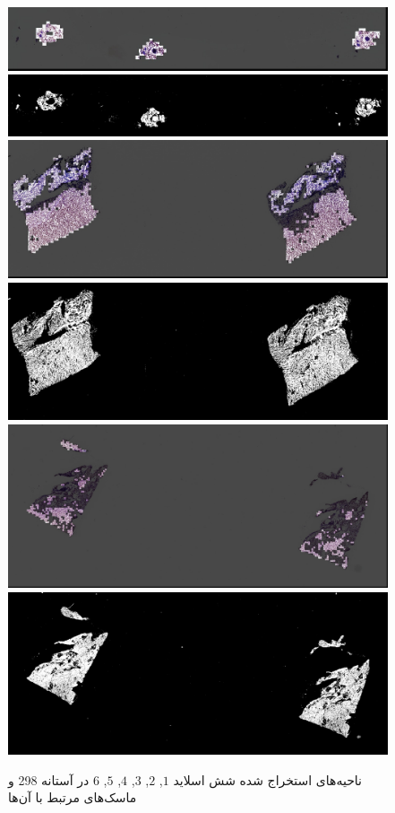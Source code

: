 \begin{enumerate}
\begin{figure}
\begin{center}
            \hspace{.2cm}
            \includegraphics[width=0.48\linewidth]{figs/introduction/subs/challenges/evaluate_slides/TCGA-EL-A4K7-11A-01-TS1.C08B59AA-87DF-4ABB-8B70-25FEF9893C7F__70_generated_mask.jpg}
            \includegraphics[width=0.48\linewidth]{figs/introduction/subs/challenges/evaluate_slides/TCGA-EL-A4K7-11A-01-TS1.C08B59AA-87DF-4ABB-8B70-25FEF9893C7F__70_masked.png}
            \hspace{.2cm}
            \includegraphics[width=0.48\linewidth]{figs/introduction/subs/challenges/evaluate_slides/TCGA-ET-A39N-01A-01-TSA.C38FCE19-9558-4035-9F0B-AD05B9BE321D___198_generated_mask.jpg}
            \includegraphics[width=0.48\linewidth]{figs/introduction/subs/challenges/evaluate_slides/TCGA-ET-A39N-01A-01-TSA.C38FCE19-9558-4035-9F0B-AD05B9BE321D___198_masked.png}
            \hspace{.2cm}
            \includegraphics[width=0.48\linewidth]{figs/introduction/subs/challenges/evaluate_slides/TCGA-BJ-A3F0-01A-01-TSA.728CE583-95BE-462B-AFDF-FC0B228DF3DE__3_generated_mask.jpg}
            \includegraphics[width=0.48\linewidth]{figs/introduction/subs/challenges/evaluate_slides/TCGA-BJ-A3F0-01A-01-TSA.728CE583-95BE-462B-AFDF-FC0B228DF3DE__3_masked.png}
        \end{center}
        \caption{ناحیه‌های استخراج شده شش اسلاید $1$, $2$, $3$, $4$, $5$, $6$ در آستانه 298 و ماسک‌های مرتبط با آن‌ها}
        \label{شکل: شش اسلاید و ماسک‌های مرتبط}
    \end{figure}
\end{enumerate}
